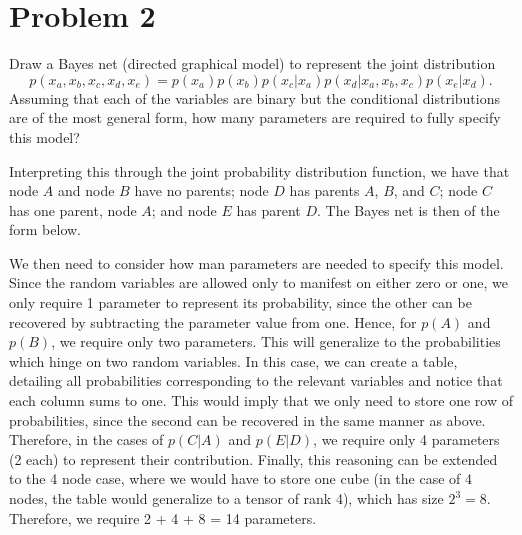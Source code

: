 \section{Problem 2}
Draw a Bayes net (directed graphical model) to represent the joint distribution
\[p(x_a, x_b, x_c, x_d, x_e) = p(x_a)p(x_b)p(x_c | x_a)p(x_d | x_a, x_b, x_c)p(x_e | x_d).\]
Assuming that each of the variables are binary but the conditional distributions are of the most general form, how many parameters are required to fully specify this model?
\partbreak
\begin{solution}

    Interpreting this through the joint probability distribution function, we have that node $A$ and node $B$ have no parents; node $D$ has parents $A$, $B$, and $C$; node $C$ has one parent, node $A$; and node $E$ has parent $D$. The Bayes net is then of the form below.  
\begin{center}
        
\end{center}

We then need to consider how man parameters are needed to specify this model. Since the random variables are allowed only to manifest on either zero or one, we only require 1 parameter to represent its probability, since the other can be recovered by subtracting the parameter value from one. Hence, for $p(A)$ and $p(B)$, we require only two parameters. This will generalize to the probabilities which hinge on two random variables. In this case, we can create a table, detailing all probabilities corresponding to the relevant variables and notice that each column sums to one. This would imply that we only need to store one row of probabilities, since the second can be recovered in the same manner as above. Therefore, in the cases of $p(C | A)$ and $p(E | D)$, we require only 4 parameters (2 each) to represent their contribution. Finally, this reasoning can be extended to the 4 node case, where we would have to store one cube (in the case of 4 nodes, the table would generalize to a tensor of rank 4), which has size $2^3 = 8$. Therefore, we require 2 + 4 + 8 = 14 parameters. 

\end{solution}

